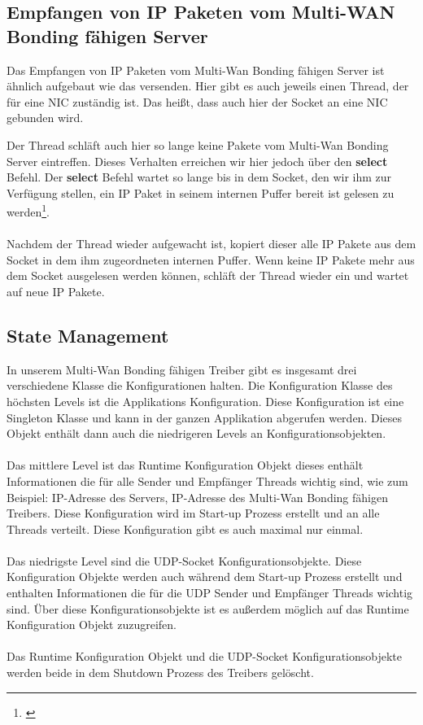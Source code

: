 \subsection{Empfangen von IP Paketen vom Multi-WAN Bonding fähigen Server}
Das Empfangen von IP Paketen vom Multi-Wan Bonding fähigen Server ist ähnlich aufgebaut wie das versenden. Hier gibt es auch jeweils einen Thread, der für eine NIC zuständig ist. Das heißt, dass auch hier der Socket an eine NIC gebunden wird.

\newpage

Der Thread schläft auch hier so lange keine Pakete vom Multi-Wan Bonding Server eintreffen. Dieses Verhalten erreichen wir hier jedoch über den \textbf{select} Befehl. Der \textbf{select} Befehl wartet so lange bis in dem Socket, den wir ihm zur Verfügung stellen, ein IP Paket in seinem internen Puffer bereit ist gelesen zu werden\footnote[1]{\cite[Vgl.][]{18}}. 
\\\\
Nachdem der Thread wieder aufgewacht ist, kopiert dieser alle IP Pakete aus dem Socket in dem ihm zugeordneten internen Puffer. Wenn keine IP Pakete mehr aus dem Socket ausgelesen werden können, schläft der Thread wieder ein und wartet auf neue IP Pakete.
\subsection{State Management}
In unserem Multi-Wan Bonding fähigen Treiber gibt es insgesamt drei verschiedene Klasse die Konfigurationen halten. Die Konfiguration Klasse des höchsten Levels ist die Applikations Konfiguration. Diese Konfiguration ist eine Singleton Klasse und kann in der ganzen Applikation abgerufen werden. Dieses Objekt enthält dann auch die niedrigeren Levels an Konfigurationsobjekten.
\\\\
Das mittlere Level ist das Runtime Konfiguration Objekt dieses enthält Informationen die für alle Sender und Empfänger Threads wichtig sind, wie zum Beispiel: IP-Adresse des Servers, IP-Adresse des Multi-Wan Bonding fähigen Treibers. Diese Konfiguration wird im Start-up Prozess erstellt und an alle Threads verteilt. Diese Konfiguration gibt es auch maximal nur einmal.
\\\\
Das niedrigste Level sind die UDP-Socket Konfigurationsobjekte. Diese Konfiguration Objekte werden auch während dem Start-up Prozess erstellt und enthalten Informationen die für die UDP Sender und Empfänger Threads wichtig sind. Über diese Konfigurationsobjekte ist es außerdem möglich auf das Runtime Konfiguration Objekt zuzugreifen. 
\\\\
Das Runtime Konfiguration Objekt und die UDP-Socket Konfigurationsobjekte werden beide in dem Shutdown Prozess des Treibers gelöscht.
